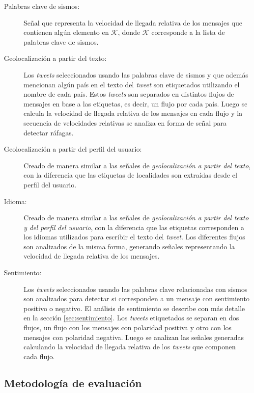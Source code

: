 \begin{description}

\item[Palabras clave de sismos:] Señal que representa la velocidad de llegada relativa de los mensajes que contienen algún elemento en $\mathcal{K}$, donde $\mathcal{K}$ corresponde a la lista de palabras clave de sismos.
 
\item[Geolocalización a partir del texto:] Los \textit{tweets} seleccionados usando las palabras clave de sismos y que además mencionan algún país en el texto del \textit{tweet} son etiquetados utilizando el nombre de cada país. Estos \textit{tweets} son separados en distintos flujos de mensajes en base a las etiquetas, es decir, un flujo por cada país. Luego se calcula la velocidad de llegada relativa de los mensajes en cada flujo y la secuencia de velocidades relativas se analiza en forma de señal para detectar ráfagas.

\item[Geolocalización a partir del perfil del usuario:] Creado de manera similar a las señales de \textit{geolocalización a partir del texto}, con la diferencia que las etiquetas de localidades son extraídas desde el perfil del usuario.

\item[Idioma:] Creado de manera similar a las señales de \textit{geolocalización a partir del texto y del perfil del usuario}, con la diferencia que las etiquetas corresponden a los idiomas utilizados para escribir el texto del \textit{tweet}. Los diferentes flujos son analizados de la misma forma, generando señales representando la velocidad de llegada relativa de los mensajes. 

\item[Sentimiento:] Los \textit{tweets} seleccionados usando las palabras clave relacionadas con sismos son analizados para detectar si corresponden a un mensaje con sentimiento positivo o negativo. El análisis de sentimiento se describe con más detalle en la sección \ref{sec:sentimiento}. Los \textit{tweets} etiquetados se separan en dos flujos, un flujo con los mensajes con polaridad positiva y otro con los mensajes con polaridad negativa. Luego se analizan las señales generadas calculando la velocidad de llegada relativa de los \textit{tweets} que componen cada flujo.

\end{description}

\subsection{Metodología de evaluación}

